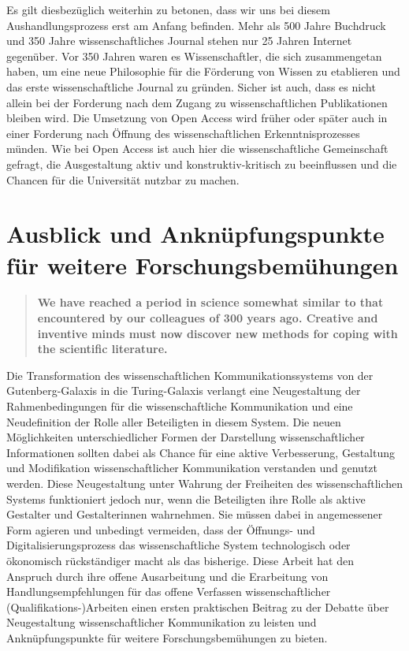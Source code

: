 Es gilt diesbezüglich weiterhin zu betonen, dass wir uns bei diesem Aushandlungsprozess erst am Anfang befinden. Mehr als 500 Jahre Buchdruck und 350 Jahre wissenschaftliches Journal stehen nur 25 Jahren Internet gegenüber. Vor 350 Jahren waren es Wissenschaftler, die sich zusammengetan haben, um eine neue Philosophie für die Förderung von Wissen zu etablieren und das erste wissenschaftliche Journal zu gründen. Sicher ist auch, dass es nicht allein bei der Forderung nach dem Zugang zu wissenschaftlichen Publikationen bleiben wird. Die Umsetzung von Open Access wird früher oder später auch in einer Forderung nach Öffnung des wissenschaftlichen Erkenntnisprozesses münden. Wie bei Open Access ist auch hier die wissenschaftliche Gemeinschaft gefragt, die Ausgestaltung aktiv und konstruktiv-kritisch zu beeinflussen und die Chancen für die Universität nutzbar zu machen.

\section{Ausblick und Anknüpfungspunkte für weitere Forschungsbemühungen}

\begin{quote}
\textbf{We have reached a period in science somewhat similar to that encountered by our colleagues of 300 years ago. Creative and inventive minds must now discover new methods for coping with the scientific literature.}
\end{quote} \cite[:229]{Porter_1964}

Die Transformation des wissenschaftlichen Kommunikationssystems von der Gutenberg-Galaxis in die Turing-Galaxis verlangt eine Neugestaltung der Rahmenbedingungen für die wissenschaftliche Kommunikation und eine Neudefinition der Rolle aller Beteiligten in diesem System. Die neuen Möglichkeiten unterschiedlicher Formen der Darstellung wissenschaftlicher Informationen sollten dabei als Chance für eine aktive Verbesserung, Gestaltung und Modifikation wissenschaftlicher Kommunikation verstanden und genutzt werden. Diese Neugestaltung unter Wahrung der Freiheiten des wissenschaftlichen Systems funktioniert jedoch nur, wenn die Beteiligten ihre Rolle als aktive Gestalter und Gestalterinnen wahrnehmen. Sie müssen dabei in angemessener Form agieren und unbedingt vermeiden, dass der Öffnungs- und Digitalisierungsprozess das wissenschaftliche System technologisch oder ökonomisch rückständiger macht als das bisherige. Diese Arbeit hat den Anspruch durch ihre offene Ausarbeitung und die Erarbeitung von Handlungsempfehlungen für das offene Verfassen wissenschaftlicher (Qualifikations-)Arbeiten einen ersten praktischen Beitrag zu der Debatte über Neugestaltung wissenschaftlicher Kommunikation zu leisten und Anknüpfungspunkte für weitere Forschungsbemühungen zu bieten.

